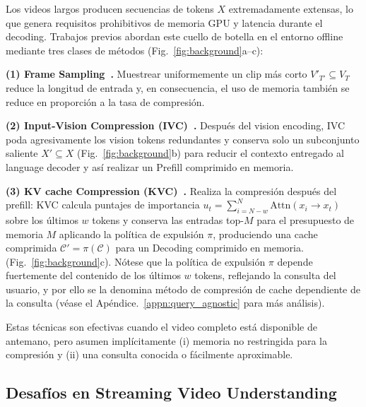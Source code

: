 Los videos largos producen secuencias de tokens $X$ extremadamente extensas, lo que genera requisitos prohibitivos de memoria GPU y latencia durante el decoding. Trabajos previos abordan este cuello de botella en el entorno offline mediante tres clases de métodos (Fig.~\ref{fig:background}a–c):

\textbf{(1) Frame Sampling~\cite{feichtenhofer2019slowfastnetworksvideorecognition}.}  
Muestrear uniformemente un clip más corto $V'_{T'} \!\subseteq\! V_T$ reduce la longitud de entrada y, en consecuencia, el uso de memoria también se reduce en proporción a la tasa de compresión. %

\textbf{(2) Input-Vision Compression (IVC)~\cite{shen2024longvu,tao2024dycokedynamiccompressiontokens}.}  
Después del vision encoding, IVC poda agresivamente los vision tokens redundantes y conserva solo un subconjunto saliente $X' \!\subseteq\! X$ (Fig.~\ref{fig:background}b) para reducir el contexto entregado al language decoder y así realizar un Prefill comprimido en memoria.

\textbf{(3) KV cache Compression (KVC)~\cite{li2024snapkv,fu2024headkv,chen2024image}.}  
Realiza la compresión después del prefill: KVC calcula puntajes de importancia  
$u_t\!=\!\sum_{i=N-w}^{N}\!\text{Attn}(x_i\!\rightarrow\!x_t)$  
sobre los últimos $w$ tokens y conserva las entradas top-$M$ para el presupuesto de memoria $M$ aplicando la política de expulsión $\pi$, produciendo una cache comprimida  
$\mathcal{C}'=\pi(\mathcal{C})$ para un Decoding comprimido en memoria.
(Fig.~\ref{fig:background}c). Nótese que la política de expulsión $\pi$ depende fuertemente del contenido de los últimos $w$ tokens, reflejando la consulta del usuario, y por ello se la denomina método de compresión de cache dependiente de la consulta (véase el Apéndice.~\ref{appn:query_agnostic} para más análisis).

Estas técnicas son efectivas cuando el video completo está disponible de antemano, pero asumen implícitamente (i) memoria no restringida para la compresión y (ii) una consulta conocida o fácilmente aproximable.




\subsection{Desafíos en Streaming Video Understanding}
\label{sec:motivation:streaming}

